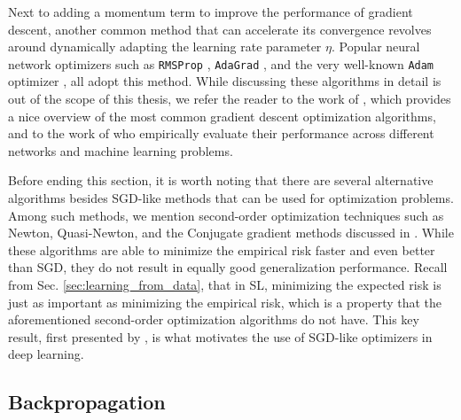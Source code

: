 Next to adding a momentum term to improve the performance of gradient descent, another common method that can accelerate its convergence revolves around dynamically adapting the learning rate parameter $\eta$. Popular neural network optimizers such as \texttt{RMSProp} \cite{tieleman2012lecture}, \texttt{AdaGrad} \cite{duchi2011adaptive}, and the very well-known \texttt{Adam} optimizer \cite{kingma2014adam}, all adopt this method. While discussing these algorithms in detail is out of the scope of this thesis, we refer the reader to the work of \citet{ruder2016overview}, which provides a nice overview of the most common gradient descent optimization algorithms, and to the work of \citet{schmidt2020descending} who empirically evaluate their performance across different networks and machine learning problems. 

Before ending this section, it is worth noting that there are several alternative algorithms besides SGD-like methods that can be used for optimization problems. Among such methods, we mention second-order optimization techniques such as Newton, Quasi-Newton, and the Conjugate gradient methods discussed in \cite{tan2019review}. While these algorithms are able to minimize the empirical risk faster and even better than SGD, they do not result in equally good generalization performance. Recall from Sec. \ref{sec:learning_from_data}, that in SL, minimizing the expected risk is just as important as minimizing the empirical risk, which is a property that the aforementioned second-order optimization algorithms do not have. This key result, first presented by \citet{bottou201113}, is what motivates the use of SGD-like optimizers in deep learning.       

\subsection{Backpropagation}
\label{sec:backprop}

